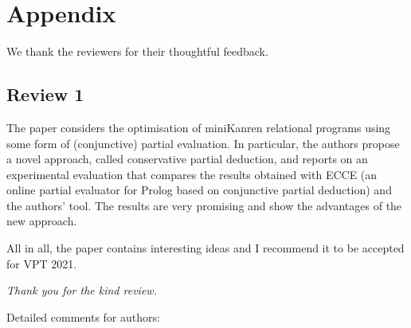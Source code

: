 \newpage

\section*{Appendix}

We thank the reviewers for their thoughtful feedback.

\subsection*{Review 1}

The paper considers the optimisation of miniKanren relational programs using some form of (conjunctive) partial evaluation. In particular, the authors propose a novel approach, called conservative partial deduction, and reports on an experimental evaluation that compares the results obtained with ECCE (an online partial evaluator for Prolog based on conjunctive partial deduction) and the authors' tool. The results are very promising and show the advantages of the new approach.

All in all, the paper contains interesting ideas and I recommend it to be accepted for VPT 2021.

\emph{Thank you for the kind review.}

Detailed comments for authors:

